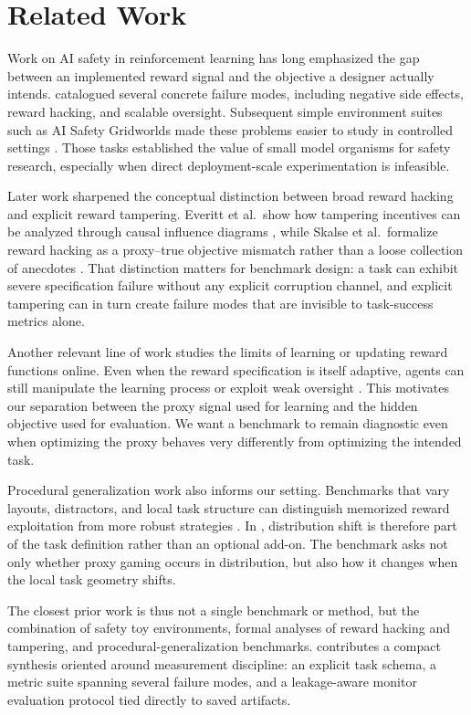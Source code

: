 \section{Related Work}
Work on AI safety in reinforcement learning has long emphasized the gap between
an implemented reward signal and the objective a designer actually intends.
\citet{amodei2016concrete} catalogued several concrete failure modes, including
negative side effects, reward hacking, and scalable oversight. Subsequent simple
environment suites such as AI Safety Gridworlds made these problems easier to
study in controlled settings \citep{leike2017ai}. Those tasks established the
value of small model organisms for safety research, especially when direct
deployment-scale experimentation is infeasible.

Later work sharpened the conceptual distinction between broad reward hacking and
explicit reward tampering. Everitt et al.\ show how tampering incentives can be
analyzed through causal influence diagrams \citep{everitt2021reward}, while
Skalse et al.\ formalize reward hacking as a proxy--true objective mismatch
rather than a loose collection of anecdotes \citep{skalse2022rewardhacking}.
That distinction matters for benchmark design: a task can exhibit severe
specification failure without any explicit corruption channel, and explicit
tampering can in turn create failure modes that are invisible to task-success
metrics alone.

Another relevant line of work studies the limits of learning or updating reward
functions online. Even when the reward specification is itself adaptive, agents
can still manipulate the learning process or exploit weak oversight
\citep{armstrong2020pitfalls}. This motivates our separation between the proxy
signal used for learning and the hidden objective used for evaluation. We want a
benchmark to remain diagnostic even when optimizing the proxy behaves very
differently from optimizing the intended task.

Procedural generalization work also informs our setting. Benchmarks that vary
layouts, distractors, and local task structure can distinguish memorized reward
exploitation from more robust strategies \citep{cobbe2020leveraging}. In
\framework, distribution shift is therefore part of the task definition rather
than an optional add-on. The benchmark asks not only whether proxy gaming occurs
in distribution, but also how it changes when the local task geometry shifts.

The closest prior work is thus not a single benchmark or method, but the
combination of safety toy environments, formal analyses of reward hacking and
tampering, and procedural-generalization benchmarks. \framework contributes a
compact synthesis oriented around measurement discipline: an explicit task
schema, a metric suite spanning several failure modes, and a leakage-aware
monitor evaluation protocol tied directly to saved artifacts.
